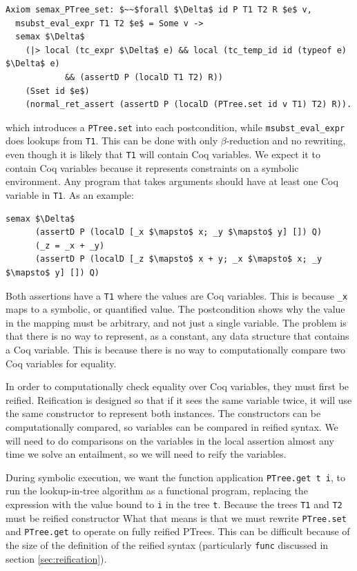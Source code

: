 \documentclass{puthesis}
\begin{document}
\begin{lstlisting}
Axiom semax_PTree_set: $~~$forall $\Delta$ id P T1 T2 R $e$ v,
  msubst_eval_expr T1 T2 $e$ = Some v ->
  semax $\Delta$
    (|> local (tc_expr $\Delta$ e) && local (tc_temp_id id (typeof e) $\Delta$ e) 
            && (assertD P (localD T1 T2) R))
    (Sset id $e$)
    (normal_ret_assert (assertD P (localD (PTree.set id v T1) T2) R)).
\end{lstlisting}

which introduces a \lstinline|PTree.set| into each postcondition,
while \lstinline|msubst_eval_expr| does lookups from
\lstinline|T1|. This can be done with only $\beta$-reduction and no
rewriting, even though it is likely that \lstinline|T1| will contain
Coq variables. We expect it to contain Coq variables because it
represents constraints on a symbolic environment. Any program that
takes arguments should have at least one Coq variable in
\lstinline|T1|. As an example:

\begin{lstlisting}
semax $\Delta$ 
      (assertD P (localD [_x $\mapsto$ x; _y $\mapsto$ y] []) Q) 
      (_z = _x + _y)
      (assertD P (localD [_z $\mapsto$ x + y; _x $\mapsto$ x; _y $\mapsto$ y] []) Q) 
\end{lstlisting}

Both assertions have a \lstinline|T1| where the values are Coq
variables. This is because \lstinline|_x| maps to a symbolic, or
quantified value.  The postcondition shows why the value in the
mapping must be arbitrary, and not just a single variable.  The
problem is that there is no way to represent, as a constant, any data
structure that contains a Coq variable. This is because there is no
way to computationally compare two Coq variables for equality.

In order to computationally check equality over Coq variables, they
must first be reified.  Reification is designed so that if it sees the
same variable twice, it will use the same constructor to represent
both instances. The constructors can be computationally compared, so
variables can be compared in reified syntax.  We will need to do
comparisons on the variables in the local assertion almost any time we
solve an entailment, so we will need to reify the variables.

During symbolic execution, we want the function application \lstinline|PTree.get t i|,
to run the lookup-in-tree algorithm as a functional
program, replacing the expression with the value bound to
\lstinline|i| in the tree \lstinline|t|. Because the trees
\lstinline|T1| and \lstinline|T2| must be reified constructor
What that means is that we must rewrite \lstinline|PTree.set| and
\lstinline|PTree.get| to operate on fully reified PTrees. 
 This can be
difficult because of the size of the definition of the reified syntax
(particularly \lstinline|func| discussed in section
\ref{sec:reification}). 
\end{document}
